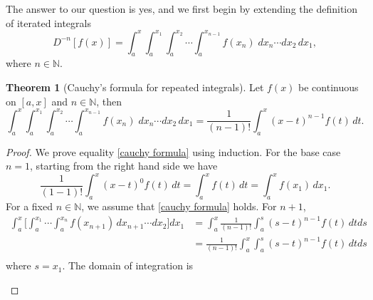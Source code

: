 \documentclass[12pt]{article}
\theoremstyle{definition}
\newtheorem{theorem}[definition]{Theorem}
\begin{document}
The answer to our question is yes, and we first begin by extending the definition of iterated integrals
\[
D^{-n}[f(x)] = \int_a^x \int_a^{x_1}\int_a^{x_2}\cdots\int_a^{x_{n-1}} f(x_n)\; dx_n \cdots dx_2\, dx_1,
\]
where $n \in \mathbb{N}$.

\begin{theorem}[Cauchy's formula for repeated integrals]
Let $f(x)$ be continuous on $[a,x]$ and $n\in \mathbb{N}$, then
%
\begin{equation}\label{cauchy formula}
\int_a^x \int_a^{x_1}\int_a^{x_2}\cdots\int_a^{x_{n-1}} f(x_n)\; dx_n \cdots dx_2\, dx_1 = \frac{1}{(n-1)!} \int_a^x (x-t)^{n-1} f(t)\, dt.
\end{equation}
\end{theorem}

\begin{proof}
We prove equality \eqref{cauchy formula} using induction.  For the base case $n=1$, starting from the right hand side we have
\[
\frac{1}{(1-1)!} \int_a^x (x-t)^0 f(t)\, dt = \int_a^x f(t)\, dt = \int_a^x f(x_1)\, dx_1.
\]
For a fixed $n\in \mathbb{N}$, we assume that \eqref{cauchy formula} holds.  For $n+1$,
%
\begin{align*}
\int_a^x\bigg[\int_a^{x_1}\cdots \int_a^{x_n} f(x_{n+1})\, dx_{n+1}\cdots dx_2\bigg] dx_1 &= \int_a^x \frac{1}{(n-1)!} \int_a^s (s-t)^{n-1} f(t)\, dt ds \\
&=\frac{1}{(n-1)!} \int_a^x \int_a^s (s-t)^{n-1} f(t)\, dt ds
 \\
\end{align*}
where $s=x_1$.  The domain of integration is
%
\begin{center}
\end{center}
\end{proof}
\end{document}
